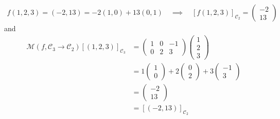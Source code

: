 {\begin{gather*}
f(1,2,3) = (-2, 13) = -2(1,0) + 13(0,1) \quad\implies\quad [f(1,2,3)]_{\mathcal{C}_2} = 
\begin{pmatrix}
-2 \\ 13
\end{pmatrix}
\end{gather*}
and
\begin{align*}
\mathcal{M}(f,\mathcal{C}_3\to\mathcal{C}_2) [(1,2,3)]_{\mathcal{C}_3} &=
\begin{pmatrix}
1 & 0 & -1 \\
0 & 2 & 3
\end{pmatrix}
\begin{pmatrix}
1 \\ 2 \\  3
\end{pmatrix}
\\
&=
1 \begin{pmatrix}  1 \\ 0 \end{pmatrix}
+
2 \begin{pmatrix}  0 \\ 2 \end{pmatrix}
+
3 \begin{pmatrix} -1 \\ 3 \end{pmatrix}\\
&=
\begin{pmatrix} -2 \\ 13 \end{pmatrix}\\
&=
[(-2,13)]_{\mathcal{C}_2}
\end{align*}
}


